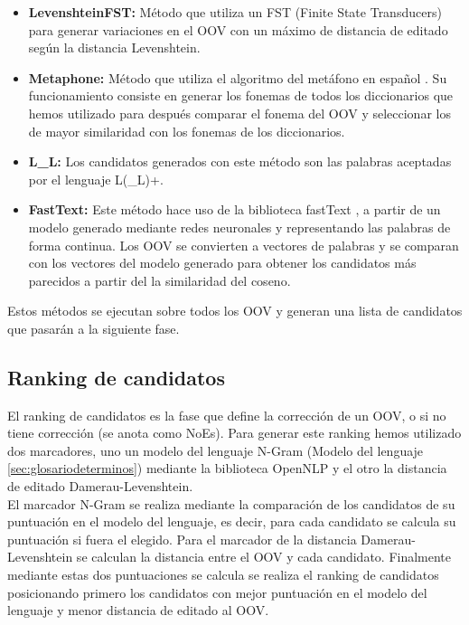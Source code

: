 \documentclass[spanish,12pt, a4paper,twoside]{paper}
\begin{document}
\begin{itemize}
	\item \textbf{LevenshteinFST:} Método que utiliza un FST (Finite State Transducers) para generar variaciones en el OOV con un máximo de distancia de editado según la distancia Levenshtein.
	\item \textbf{Metaphone:} Método que utiliza el algoritmo del metáfono en español \cite{mosquera:2011}. Su funcionamiento consiste en generar los fonemas de todos los diccionarios que hemos utilizado para después comparar el fonema del OOV y seleccionar los de mayor similaridad con los fonemas de los diccionarios.
	\item \textbf{L\_L:} Los candidatos generados con este método son las palabras aceptadas por el lenguaje L(\_L)+.
	\item \textbf{FastText:} Este método hace uso de la biblioteca fastText \cite{facebook:fasttext}, a partir de un modelo generado mediante redes neuronales y representando las palabras de forma continua. Los OOV se convierten a vectores de palabras y se comparan con los vectores del modelo generado para obtener los candidatos más parecidos a partir del la similaridad del coseno.	
\end{itemize}

Estos métodos se ejecutan sobre todos los OOV y generan una lista de candidatos que pasarán a la siguiente fase.

\subsection{Ranking de candidatos}\label{sec:rankingdecandidatos}
El ranking de candidatos es la fase que define la corrección de un OOV, o si no tiene corrección (se anota como NoEs). Para generar este ranking hemos utilizado dos marcadores, uno un modelo del lenguaje N-Gram (Modelo del lenguaje \ref{sec:glosariodeterminos}) mediante la biblioteca OpenNLP \cite{opennlp} y el otro la distancia de editado Damerau-Levenshtein.\\

El marcador N-Gram se realiza mediante la comparación de los candidatos de su puntuación en el modelo del lenguaje, es decir, para cada candidato se calcula su puntuación si fuera el elegido. Para el marcador de la distancia Damerau-Levenshtein se calculan la distancia entre el OOV y cada candidato. Finalmente mediante estas dos puntuaciones se calcula se realiza el ranking de candidatos posicionando primero los candidatos con mejor puntuación en el modelo del lenguaje y menor distancia de editado al OOV.\\
\end{document}
